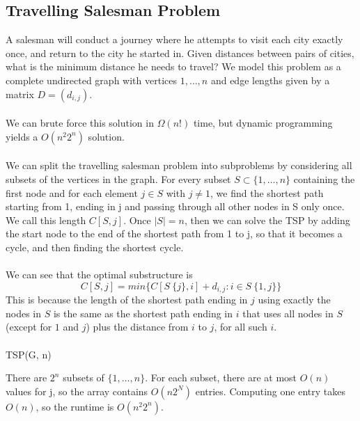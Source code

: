 \documentclass{article}
\begin{document}
    \subsection{Travelling Salesman Problem}
        A salesman will conduct a journey where he attempts to visit each city exactly once, and return to the city he started in. Given distances between pairs of cities, what is the minimum distance he needs to travel? We model this problem as a complete undirected graph with vertices $1,\dots, n$ and edge lengths given by a matrix $D = (d_{i,j})$. \\ \\
        We can brute force this solution in $\Omega (n!)$ time, but dynamic programming yields a $O(n^2 2^n)$ solution. \\ \\
        We can split the travelling salesman problem into subproblems by considering all subsets of the vertices in the graph. For every subset $S \subset \{1, \dots, n \}$ containing the first node and for each element $j \in S$ with $j \neq 1$, we find the shortest path starting from 1, ending in j and passing through all  other nodes in S only once. We call this length $C[S,j]$. Once $|S| = n$, then we can solve the TSP by adding the start node to the end of the shortest path from 1 to j, so that it becomes a cycle, and then finding the shortest cycle. \\ \\
        We can see that the optimal substructure is 
        \[ C[S, j] = min \{ C[S \ \{ j \}, i] + d_{i,j} : i \in S \ \{ 1,j\} \} \]
        This is because the length of the shortest path ending in $j$ using exactly the nodes in $S$ is the same as the shortest path ending in $i$ that uses all nodes in $S$ (except for $1$ and $j$) plus the distance from $i$ to $j$, for all such $i$. \\ \\
        TSP(G, n)
        \begin{algorithmic}[1]
            \EndFor
                    \EndFor
                \EndFor
            \EndFor
        \end{algorithmic}
        There are $2^n$ subsets of $\{1,\dots,n\}$. For each subset, there are at most $O(n)$ values for j, so the array contains $O(n 2^N)$ entries. Computing one entry takes $O(n)$, so the runtime is $O(n^2 2^n)$.
\end{document}
